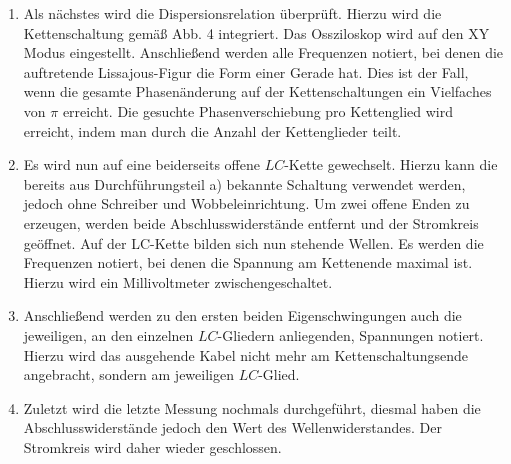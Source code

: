 \begin{enumerate}
\item Als nächstes wird die Dispersionsrelation überprüft. Hierzu wird die
 Kettenschaltung gemäß Abb. 4 integriert. Das Ossziloskop
  wird auf den XY Modus eingestellt. Anschließend werden alle Frequenzen notiert,
    bei denen die auftretende Lissajous-Figur die Form einer Gerade hat. Dies ist der
     Fall, wenn die gesamte Phasenänderung auf der Kettenschaltungen ein
      Vielfaches von $\pi$ erreicht. Die gesuchte Phasenverschiebung pro Kettenglied
       wird erreicht, indem man durch die Anzahl der Kettenglieder teilt.

\item Es wird nun auf eine beiderseits offene $LC$-Kette gewechselt. Hierzu kann
 die bereits aus Durchführungsteil a) bekannte Schaltung verwendet werden,
  jedoch ohne Schreiber und Wobbeleinrichtung. Um zwei offene Enden zu
   erzeugen, werden beide Abschlusswiderstände entfernt und der Stromkreis geöffnet.
    Auf der LC-Kette bilden sich nun stehende Wellen.
   Es werden die Frequenzen notiert, bei denen die Spannung am Kettenende
    maximal ist. Hierzu wird ein Millivoltmeter zwischengeschaltet.

\item Anschließend werden zu den ersten beiden Eigenschwingungen auch die
 jeweiligen, an den einzelnen $LC$-Gliedern anliegenden, Spannungen notiert. Hierzu wird
  das ausgehende Kabel nicht mehr am Kettenschaltungsende angebracht, sondern
   am jeweiligen $LC$-Glied.

   \item Zuletzt wird die letzte Messung nochmals durchgeführt, diesmal
   haben die Abschlusswiderstände jedoch den Wert des Wellenwiderstandes.
    Der Stromkreis wird daher wieder geschlossen.


\end{enumerate}

